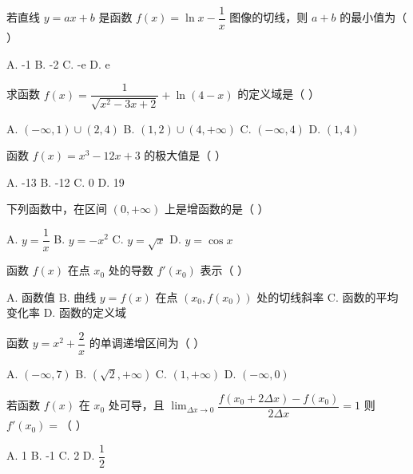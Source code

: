 \documentclass[11pt, a4paper]{article}
\begin{document}
\begin{baitap}[5]
若直线 $y = ax + b$ 是函数 $f(x) = \ln x - \dfrac{1}{x}$ 图像的切线，则 $a + b$ 的最小值为（ ）
\par\vspace{3pt}
\noindent A. -1 \quad B. -2 \quad C. -e \quad D. e
\end{baitap}

\begin{baitap}[6]
求函数 $f(x) = \dfrac{1}{\sqrt{x^2 - 3x + 2}} + \ln(4 - x)$ 的定义域是（ ）
\par\vspace{3pt}
\noindent A. $(-\infty, 1) \cup (2,4)$ \quad B. $(1,2) \cup (4, +\infty)$ \quad C. $(-\infty, 4)$ \quad D. $(1,4)$
\end{baitap}

\begin{baitap}[7]
函数 $f(x) = x^3 - 12x + 3$ 的极大值是（ ）
\par\vspace{3pt}
\noindent A. -13 \quad B. -12 \quad C. 0 \quad D. 19
\end{baitap}

\begin{baitap}[8]
下列函数中，在区间 $(0, +\infty)$ 上是增函数的是（ ）
\par\vspace{3pt}
\noindent A. $y = \dfrac{1}{x}$ \quad B. $y = -x^2$ \quad C. $y = \sqrt{x}$ \quad D. $y = \cos x$
\end{baitap}

\begin{baitap}[9]
函数 $f(x)$ 在点 $x_0$ 处的导数 $f'(x_0)$ 表示（ ）
\par\vspace{3pt}
\noindent A. 函数值 \quad B. 曲线 $y = f(x)$ 在点 $(x_0, f(x_0))$ 处的切线斜率 \quad C. 函数的平均变化率 \quad D. 函数的定义域
\end{baitap}

\begin{baitap}[10]
函数 $y = x^2 + \dfrac{2}{x}$ 的单调递增区间为（ ）
\par\vspace{3pt}
\noindent A. $(-\infty, 7)$ \quad B. $(\sqrt{2}, +\infty)$ \quad C. $(1, +\infty)$ \quad D. $(-\infty, 0)$
\end{baitap}

\begin{baitap}[11]
若函数 $f(x)$ 在 $x_0$ 处可导，且 $\lim_{\Delta x \to 0} \dfrac{f(x_0 + 2\Delta x) - f(x_0)}{2\Delta x} = 1$ 则 $f'(x_0) =$（ ）
\par\vspace{3pt}
\noindent A. 1 \quad B. -1 \quad C. 2 \quad D. $\dfrac{1}{2}$
\end{baitap}
\end{document}
